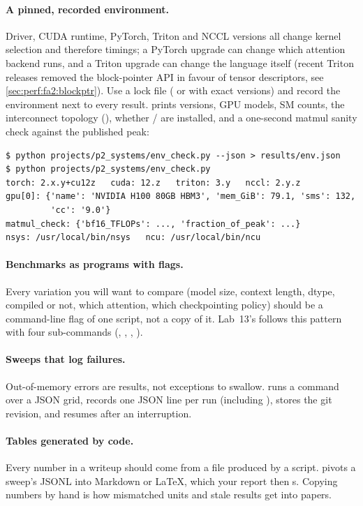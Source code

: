 \paragraph{A pinned, recorded environment.} Driver, CUDA runtime, PyTorch, Triton and NCCL
versions all change kernel selection and therefore timings; a PyTorch upgrade can change which
attention backend runs, and a Triton upgrade can change the language itself (recent Triton
releases removed the block-pointer API in favour of tensor descriptors, see
\cref{sec:perf:fa2:blockptr}). Use a lock file ( or  with exact
versions) and record the environment next to every result. 
prints versions, GPU models, SM counts, the interconnect topology (),
whether / are installed, and a one-second matmul sanity check against the
published peak:

\begin{lstlisting}[style=shell]
$ python projects/p2_systems/env_check.py --json > results/env.json
$ python projects/p2_systems/env_check.py
torch: 2.x.y+cu12z   cuda: 12.z   triton: 3.y   nccl: 2.y.z
gpu[0]: {'name': 'NVIDIA H100 80GB HBM3', 'mem_GiB': 79.1, 'sms': 132,
         'cc': '9.0'}
matmul_check: {'bf16_TFLOPs': ..., 'fraction_of_peak': ...}
nsys: /usr/local/bin/nsys   ncu: /usr/local/bin/ncu
\end{lstlisting}

\paragraph{Benchmarks as programs with flags.} Every variation you will want to compare
(model size, context length, dtype, compiled or not, which attention, which checkpointing
policy) should be a command-line flag of one script, not a copy of it. Lab~13's
 follows this pattern with four sub-commands (, ,
, ).

\paragraph{Sweeps that log failures.} Out-of-memory errors are results, not exceptions to swallow.
 runs a command over a JSON grid, records one JSON line per run
(including ), stores the git revision, and resumes after an interruption.

\paragraph{Tables generated by code.} Every number in a writeup should come from a file produced by
a script.  pivots a sweep's JSONL into Markdown or LaTeX, which your
report then s. Copying numbers by hand is how mismatched units and stale
results get into papers.

